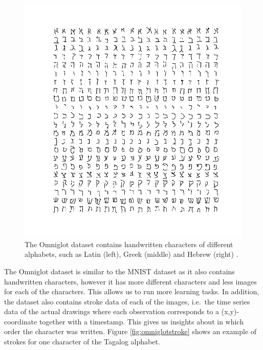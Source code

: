 \begin{figure}[h]
\begin{minipage}{.32\textwidth}
\end{minipage}
\begin{minipage}{.32\textwidth}
  \centering
  \includegraphics[width=\linewidth]{images/hebrew}
\end{minipage}
\caption{The Omniglot dataset contains handwritten characters of different alphabets, such as Latin (left), Greek (middle) and Hebrew (right) \cite{Lake1332}.}
\label{fig:omniglotcharacters}
\end{figure}

The Omniglot dataset is similar to the MNIST dataset as it also contains handwritten characters, however it has more different characters and less images for each of the characters. This allows us to run more learning tasks. In addition, the dataset also contains stroke data of each of the images, i.e.\ the time series data of the actual drawings where each observation corresponds to a (x,y)-coordinate together with a timestamp. This gives us insights about in which order the character was written. Figure \ref{fig:omniglotstroke} shows an example of strokes for one character of the Tagalog alphabet.

